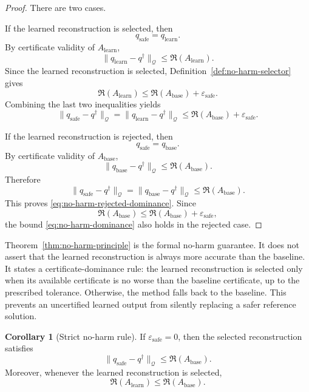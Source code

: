 \documentclass{article}
\numberwithin{equation}{section}
\theoremstyle{definition}
\newtheorem{corollary}{Corollary}
\begin{document}
\begin{proof}
There are two cases.

If the learned reconstruction is selected, then
\[
q_{\mathrm{safe}}=q_{\mathrm{learn}}.
\]
By certificate validity of \(A_{\mathrm{learn}}\),
\[
\|q_{\mathrm{learn}}-q^\dagger\|_{\mathcal Q}
\le
\mathfrak R(A_{\mathrm{learn}}).
\]
Since the learned reconstruction is selected, Definition~\ref{def:no-harm-selector} gives
\[
\mathfrak R(A_{\mathrm{learn}})
\le
\mathfrak R(A_{\mathrm{base}})
+
\varepsilon_{\mathrm{safe}}.
\]
Combining the last two inequalities yields
\[
\|q_{\mathrm{safe}}-q^\dagger\|_{\mathcal Q}
=
\|q_{\mathrm{learn}}-q^\dagger\|_{\mathcal Q}
\le
\mathfrak R(A_{\mathrm{base}})
+
\varepsilon_{\mathrm{safe}}.
\]

If the learned reconstruction is rejected, then
\[
q_{\mathrm{safe}}=q_{\mathrm{base}}.
\]
By certificate validity of \(A_{\mathrm{base}}\),
\[
\|q_{\mathrm{base}}-q^\dagger\|_{\mathcal Q}
\le
\mathfrak R(A_{\mathrm{base}}).
\]
Therefore
\[
\|q_{\mathrm{safe}}-q^\dagger\|_{\mathcal Q}
=
\|q_{\mathrm{base}}-q^\dagger\|_{\mathcal Q}
\le
\mathfrak R(A_{\mathrm{base}}).
\]
This proves \eqref{eq:no-harm-rejected-dominance}. Since
\[
\mathfrak R(A_{\mathrm{base}})
\le
\mathfrak R(A_{\mathrm{base}})
+
\varepsilon_{\mathrm{safe}},
\]
the bound \eqref{eq:no-harm-dominance} also holds in the rejected case.
\end{proof}

Theorem~\ref{thm:no-harm-principle} is the formal no-harm guarantee. It does not assert that the learned reconstruction is always more accurate than the baseline. It states a certificate-dominance rule: the learned reconstruction is selected only when its available certificate is no worse than the baseline certificate, up to the prescribed tolerance. Otherwise, the method falls back to the baseline. This prevents an uncertified learned output from silently replacing a safer reference solution.

\begin{corollary}[Strict no-harm rule]
\label{cor:strict-no-harm}
If \(\varepsilon_{\mathrm{safe}}=0\), then the selected reconstruction satisfies
\begin{equation}
\|q_{\mathrm{safe}}-q^\dagger\|_{\mathcal Q}
\le
\mathfrak R(A_{\mathrm{base}}).
\label{eq:strict-no-harm}
\end{equation}
Moreover, whenever the learned reconstruction is selected,
\begin{equation}
\mathfrak R(A_{\mathrm{learn}})
\le
\mathfrak R(A_{\mathrm{base}}).
\label{eq:selected-certificate-dominance}
\end{equation}
\end{corollary}
\end{document}

